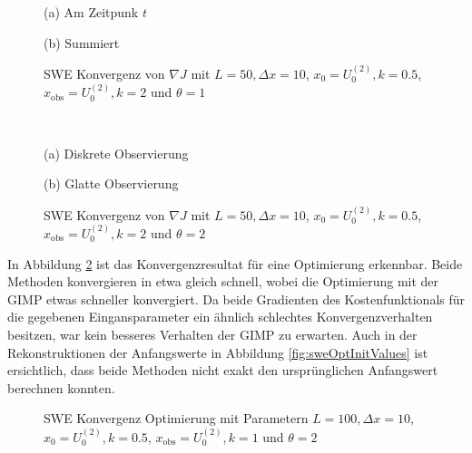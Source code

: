 \begin{figure}
\footnotesize
\begin{minipage}[b]{0.49\linewidth}
\centering

\caption*{(a) Am Zeitpunk $t$}
\end{minipage}
\begin{minipage}[b]{0.49\linewidth}
\centering

\caption*{(b) Summiert}
\end{minipage}
\caption{SWE Konvergenz von $\nabla J$ mit $L=50,\Delta x=10$, $x_0=U_0^{(2)},k=0.5$, $x_{\text{obs}} = U_0^{(2)}, k=2$ und $\theta=1$}
\label{fig:sweConvergenceAdjoint}
% 
\quad\\[0.3cm]
\begin{minipage}[b]{0.49\linewidth}
\centering

\caption*{(a) Diskrete Observierung}
\end{minipage}
\begin{minipage}[b]{0.49\linewidth}
\centering

\caption*{(b) Glatte Observierung}
\end{minipage}
\caption{SWE Konvergenz von $\nabla J$ mit $L=50,\Delta x=10$, $x_0=U_0^{(2)},k=0.5$, $x_{\text{obs}} = U_0^{(2)}, k=2$ und $\theta=2$}
\label{fig:sweConvergenceAdjoint1}
\end{figure}


In Abbildung \ref{fig:sweConvergenceOpt} ist das Konvergenzresultat für eine Optimierung erkennbar. Beide Methoden konvergieren in etwa gleich schnell, wobei die Optimierung mit der GIMP etwas schneller konvergiert. Da beide Gradienten des Kostenfunktionals für die gegebenen Eingansparameter ein ähnlich schlechtes Konvergenzverhalten besitzen, war kein besseres Verhalten der GIMP zu erwarten. Auch in der Rekonstruktionen der Anfangswerte in Abbildung \ref{fig:sweOptInitValues} ist ersichtlich, dass beide Methoden nicht exakt den ursprünglichen Anfangswert berechnen konnten.
\begin{figure}[H]
\centering

\caption{SWE Konvergenz Optimierung mit Parametern $L=100,\Delta x=10$, $x_0=U_0^{(2)},k=0.5$, $x_{\text{obs}} = U_0^{(2)}, k=1$ und $\theta=2$}
\label{fig:sweConvergenceOpt}
\end{figure}

